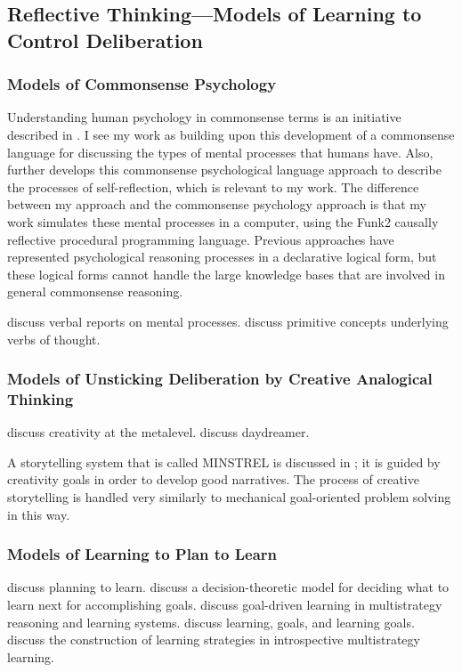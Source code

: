 \subsection{Reflective Thinking---Models of Learning to Control Deliberation}

\subsubsection{Models of Commonsense Psychology}

Understanding human psychology in commonsense terms is an initiative described in \cite{gordon:2004}.
I see my work as building upon this development of a commonsense language for discussing the types of mental processes that humans have.
Also, \cite{gordon:2008} further develops this commonsense psychological language approach to describe the processes of self-reflection, which is relevant to my work.
The difference between my approach and the commonsense psychology approach is that my work simulates these mental processes in a computer, using the Funk2 causally reflective procedural programming language.
Previous approaches have represented psychological reasoning processes in a declarative logical form, but these logical forms cannot handle the large knowledge bases that are involved in general commonsense reasoning.

\cite{wilson:1977} discuss verbal reports on mental processes.
\cite{schank:1972} discuss primitive concepts underlying verbs of thought.

\subsubsection{Models of Unsticking Deliberation by Creative Analogical Thinking}

\cite{buchanan:1977} discuss creativity at the metalevel.
\cite{mueller:1990} discuss daydreamer.

A storytelling system that is called MINSTREL is discussed in \cite{turner:1994}; it is guided by creativity goals in order to develop good narratives.
The process of creative storytelling is handled very similarly to mechanical goal-oriented problem solving in this way.

\subsubsection{Models of Learning to Plan to Learn}

\cite{ram:1995a} discuss planning to learn.
\cite{desjardins:1995} discuss a decision-theoretic model for deciding what to learn next for accomplishing goals.
\cite{ram:1995b} discuss goal-driven learning in multistrategy reasoning and learning systems.
\cite{ram:1995c} discuss learning, goals, and learning goals.
\cite{cox:1999a} discuss the construction of learning strategies in introspective multistrategy learning.

